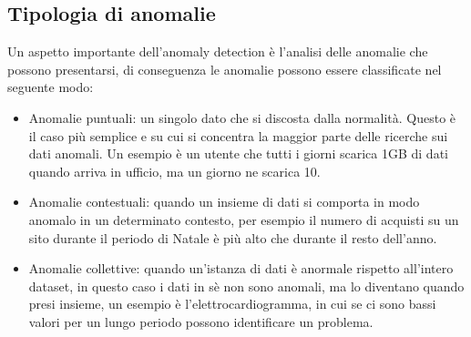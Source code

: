 \subsection{Tipologia di anomalie}
Un aspetto importante dell'anomaly detection è l'analisi delle anomalie che possono presentarsi, di conseguenza le anomalie possono essere classificate nel seguente modo:
\begin{itemize}
    \item Anomalie puntuali: un singolo dato che si discosta dalla normalità. Questo è il caso più semplice e su cui si concentra la maggior parte delle ricerche sui dati anomali. Un esempio è un utente che tutti i giorni scarica 1GB di dati quando arriva in ufficio, ma un giorno ne scarica 10.
    \item Anomalie contestuali: quando un insieme di dati si comporta in modo anomalo in un determinato contesto, per esempio il numero di acquisti su un sito durante il periodo di Natale è più alto che durante il resto dell'anno.
    \item Anomalie collettive: quando un'istanza di dati è anormale rispetto all'intero dataset, in questo caso i dati in sè non sono anomali, ma lo diventano quando presi insieme, un esempio è l'elettrocardiogramma, in cui se ci sono bassi valori per un lungo periodo possono identificare un problema.
\end{itemize}

